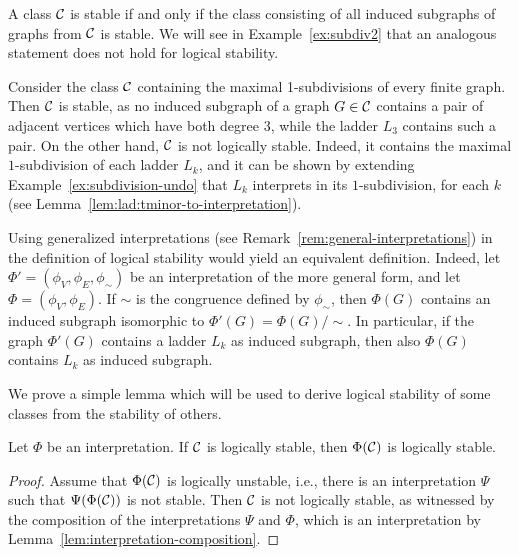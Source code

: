 \begin{example}
	 A class ${\cal C}$ is stable if and only if the class consisting of all 
	induced subgraphs of graphs from ${\cal C}$ is stable. 
		We will see in Example~\ref{ex:subdiv2} that an analogous statement does not hold for logical stability.
\end{example}
	
\begin{example}\label{ex:subdiv1}
	Consider the class ${\cal C}$ containing the maximal 1-subdivisions of 
	every finite graph.
	Then ${\cal C}$ is stable, as no induced subgraph of a graph $G\in {\cal C}$ contains a  pair of adjacent vertices which have both degree $3$, while the ladder $L_3$ contains such a pair.
		On the other hand, ${\cal C}$ is not logically stable.
	Indeed, it contains the maximal $1$-subdivision of each ladder $L_k$,
	and it can be shown by extending Example~\ref{ex:subdivision-undo} 
	that $L_k$ interprets in its $1$-subdivision, for each $k$ (see Lemma~\ref{lem:lad:tminor-to-interpretation}).
\end{example}	

\begin{remark}\label{rem:general-stab}
  Using generalized interpretations (see Remark~\ref{rem:general-interpretations}) in the definition of logical stability would yield an equivalent definition. Indeed, let $\Phi'=(\phi_V,\phi_E,\phi_\sim)$ be an interpretation of the more general form, and let $\Phi=(\phi_V,\phi_E)$.
  If $\sim$ is the congruence defined by $\phi_\sim$, then
    $\Phi(G)$ contains an induced subgraph isomorphic to $\Phi'(G)=\Phi(G)/{\sim}$.
  In particular,  if the graph $\Phi'(G)$
  contains a ladder $L_k$ as induced subgraph, then also $\Phi(G)$ contains $L_k$ as induced subgraph.
\end{remark}
	
	We prove a simple lemma which will be used to derive logical stability 	of some classes from the stability of others.

\begin{lemma}\label{lem:stab-int}
	Let $\Phi$ be an interpretation. If ${\cal C}$ is logically stable, then  $\Phi({\cal C})$ is logically stable.
\end{lemma}
\begin{proof}Assume that $\Phi({\cal C})$ is logically unstable, i.e.,
	there is an interpretation $\Psi$ such that $\Psi(\Phi({\cal C}))$
	is not stable. Then ${\cal C}$ is not logically stable, as witnessed by the composition of the interpretations $\Psi$ and $\Phi$, which is an interpretation by Lemma~\ref{lem:interpretation-composition}.	
\end{proof}


